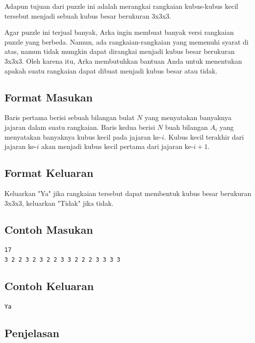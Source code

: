 \documentclass{article}
\begin{document}
\par\noindent Adapun tujuan dari puzzle ini adalah merangkai rangkaian kubus-kubus kecil tersebut menjadi sebuah kubus besar berukuran 3x3x3.

\par\noindent Agar puzzle ini terjual banyak, Arka ingin membuat banyak versi rangkaian puzzle yang berbeda. Namun, ada rangkaian-rangkaian yang memenuhi syarat di atas, namun tidak mungkin dapat dirangkai menjadi kubus besar berukuran 3x3x3. Oleh karena itu, Arka membutuhkan bantuan Anda untuk menentukan apakah suatu rangkaian dapat dibuat menjadi kubus besar atau tidak.

\subsection*{Format Masukan}

\par\noindent Baris pertama berisi sebuah bilangan bulat $N$ yang menyatakan banyaknya jajaran dalam suatu rangkaian. Baris kedua berisi $N$ buah bilangan $A_i$ yang menyatakan banyaknya kubus kecil pada jajaran ke-$i$. Kubus kecil terakhir dari jajaran ke-$i$ akan menjadi kubus kecil pertama dari jajaran ke-$i+1$.

\subsection*{Format Keluaran}

\par\noindent Keluarkan "Ya" jika rangkaian tersebut dapat membentuk kubus besar berukuran 3x3x3, keluarkan "Tidak" jika tidak.

\subsection*{Contoh Masukan}

\begin{lstlisting}
17
3 2 2 3 2 3 2 2 3 3 2 2 2 3 3 3 3
\end{lstlisting}

\subsection*{Contoh Keluaran}

\begin{lstlisting}
Ya
\end{lstlisting}

\subsection*{Penjelasan}
\end{document}
